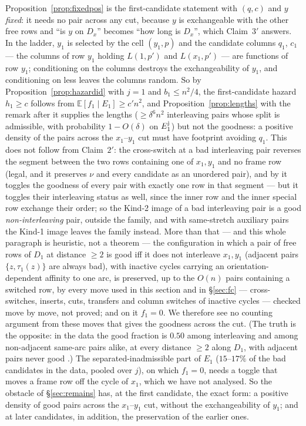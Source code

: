 \documentclass[11pt]{article}
\theoremstyle{definition}
\begin{document}
Proposition~\ref{prop:fixedpos} is the first-candidate statement with $(q,c)$ and $y$
\emph{fixed}: it needs no pair across any cut, because $y$ is exchangeable with the other
free rows and ``is $y$ on $D_x$'' becomes ``how long is $D_x$'', which Claim~$3'$
answers.  In the ladder, $y_1$ is selected by the cell $(y_1,p)$ and the candidate
columns $q_1$, $c_1$ --- the columns of row $y_1$ holding $L(1,p')$ and $L(x_1,p')$ --- are
functions of row $y_1$; conditioning on the columns destroys the exchangeability of
$y_1$, and conditioning on less leaves the columns random.  So by
Proposition~\ref{prop:hazardid} with $j=1$ and $b_1\le n^2/4$, the first-candidate hazard
$h_1\ge c$ follows from $\mathbb E[f_1\mid E_1]\ge c'n^2$, and
Proposition~\ref{prop:lengths} with the remark after it supplies the lengths ($\ge\delta^6n^2$ interleaving pairs whose split is admissible, with
probability $1-O(\delta)$ on $E_1^{\rm j}$) but not the goodness: a positive density of the
pairs across the $x_1$--$y_1$ cut must have footprint avoiding $q_1$.  This does not
follow from Claim~$2'$: the cross-switch at a bad interleaving pair reverses the segment
between the two rows containing one of $x_1,y_1$ and no frame row (legal, and it preserves
$\nu$ and every candidate as an unordered pair), and by \cite[Lemma~2.6]{AM26} it toggles the goodness of
every pair with exactly one row in that segment --- but it toggles their interleaving
status as well, since the inner row and the inner special row exchange their order; so the
Kind-2 image of a bad interleaving pair is a good \emph{non-interleaving} pair, outside the
family, and with same-stretch auxiliary pairs the Kind-1 image leaves the family instead.
More than that --- and this whole paragraph is heuristic, not a theorem --- the
configuration in which a pair of free rows of $D_1$ at distance $\ge2$
is good iff it does not interleave $x_1,y_1$ (adjacent pairs $\{z,\tau_1(z)\}$ are always
bad), with inactive cycles carrying an orientation-dependent affinity to one arc, is
preserved, up to the $O(n)$ pairs containing a switched row, by every move used in this
section and in \S\ref{sec:fc} --- cross-switches, inserts, cuts, transfers and column
switches of inactive cycles --- checked move by move, not proved; and on it $f_1=0$.  We
therefore see no counting argument from these moves that gives the goodness across the
cut.
(The truth is the opposite: in the data the good fraction is $0.50$ among interleaving and
among non-adjacent same-arc pairs alike, at every distance $\ge2$ along $D_1$, with
adjacent pairs never good \cite{repo}.)  The separated-inadmissible part of $E_1$ ($15$--$17\%$
of the bad candidates in the data, pooled over $j$), on which $f_1=0$, needs a toggle that moves a
frame row off the cycle of $x_1$, which we have not analysed.  So the obstacle of
\S\ref{sec:remains} has, at the first candidate, the exact form: a positive density of
good pairs across the $x_1$--$y_1$ cut, without the exchangeability of $y_1$; and at later
candidates, in addition, the preservation of the earlier ones.
\end{document}
